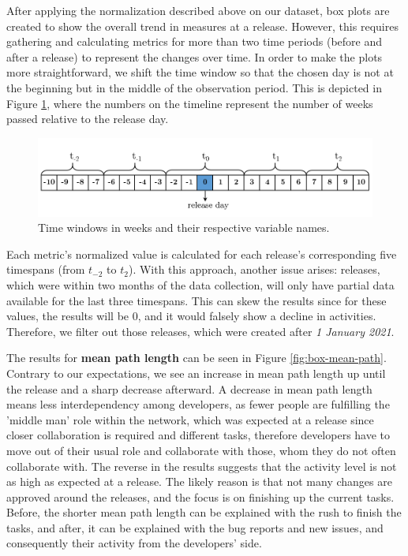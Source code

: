 After applying the normalization described above on our dataset, box plots are created to show the overall trend in measures at a release. However, this requires gathering and calculating metrics for more than two time periods (before and after a release) to represent the changes over time. In order to make the plots more straightforward, we shift the time window so that the chosen day is not at the beginning but in the middle of the observation period. This is depicted in Figure \ref{fig:time-window}, where the numbers on the timeline represent the number of weeks passed relative to the release day.

\begin{figure}[!htbp]
    \centering
    \includegraphics[width=\textwidth]{figures/quantitative/time_window.png}
    \caption{Time windows in weeks and their respective variable names.}
    \label{fig:time-window}
\end{figure}


Each metric's normalized value is calculated for each release's corresponding five timespans (from $t_{-2}$ to $t_2$). With this approach, another issue arises: releases, which were within two months of the data collection, will only have partial data available for the last three timespans. This can skew the results since for these values, the results will be 0, and it would falsely show a decline in activities. Therefore, we filter out those releases, which were created after \textit{1 January 2021}.

The results for \textbf{mean path length} can be seen in Figure \ref{fig:box-mean-path}. Contrary to our expectations, we see an increase in mean path length up until the release and a sharp decrease afterward. A decrease in mean path length means less interdependency among developers, as fewer people are fulfilling the 'middle man' role within the network, which was expected at a release since closer collaboration is required and different tasks, therefore developers have to move out of their usual role and collaborate with those, whom they do not often collaborate with. The reverse in the results suggests that the activity level is not as high as expected at a release. The likely reason is that not many changes are approved around the releases, and the focus is on finishing up the current tasks. Before, the shorter mean path length can be explained with the rush to finish the tasks, and after, it can be explained with the bug reports and new issues, and consequently their activity from the developers' side.

